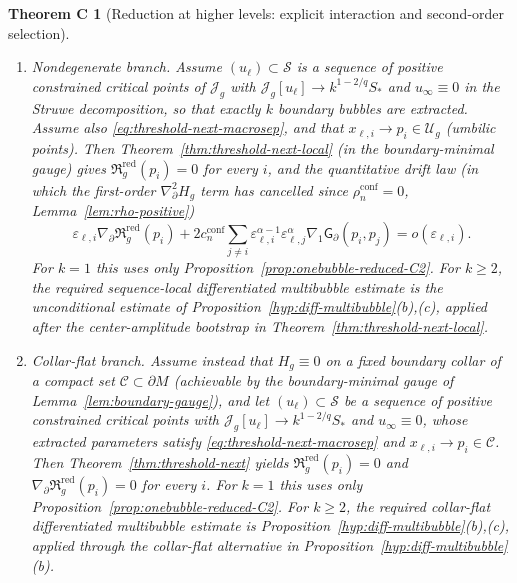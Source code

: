 \documentclass[11pt,reqno,a4paper]{amsart}
\numberwithin{equation}{section}
\theoremstyle{plain}
\theoremstyle{remark}
\theoremstyle{plain}
\newtheorem*{thmC}{Theorem C}
\begin{document}
\begin{thmC}[Reduction at higher levels: explicit interaction and second-order selection]
\begin{enumerate}[label=\textup{(\alph*)},leftmargin=1.5em]
\begin{enumerate}[label=\textup{(\roman*)},leftmargin=1.5em]
\item
\emph{Nondegenerate branch.}
Assume $(u_\ell)\subset\mathcal S$ is a sequence of positive constrained critical points
of $\mathcal J_g$ with
$\mathcal J_g[u_\ell]\to k^{1-2/q}S_\ast$ and $u_\infty\equiv0$
in the Struwe decomposition, so that exactly $k$ boundary bubbles are extracted.
Assume also \eqref{eq:threshold-next-macrosep}, and that
$x_{\ell,i}\to p_i\in\mathcal U_g$ (umbilic points).
Then Theorem~\ref{thm:threshold-next-local} (in the boundary-minimal gauge) gives
$\mathfrak R_g^{\mathrm{red}}(p_i)=0$ for every $i$,
and the quantitative drift law
(in which the first-order $\nabla^2_\partial H_g$ term has cancelled since
$\rho_n^{\mathrm{conf}}=0$, Lemma~\ref{lem:rho-positive})
\[
\varepsilon_{\ell,i}\nabla_\partial\mathfrak R_g^{\mathrm{red}}(p_i)
+2c_n^{\mathrm{conf}}\sum_{j\ne i}
\varepsilon_{\ell,i}^{\alpha-1}\varepsilon_{\ell,j}^{\alpha}
\nabla_1\mathsf G_\partial(p_i,p_j)
=o(\varepsilon_{\ell,i}).
\]
For $k=1$ this uses only Proposition~\ref{prop:onebubble-reduced-C2}.
For $k\ge2$, the required sequence-local differentiated multibubble estimate is the unconditional estimate of
Proposition~\ref{hyp:diff-multibubble}\textup{(b),(c)}, applied after the center-amplitude bootstrap in
Theorem~\ref{thm:threshold-next-local}.

\item
\emph{Collar-flat branch.}
Assume instead that $H_g\equiv0$ on a fixed boundary collar of a compact set
$\mathcal C\subset \partial M$ (achievable by the boundary-minimal gauge of Lemma~\ref{lem:boundary-gauge}),
and let $(u_\ell)\subset\mathcal S$ be a sequence of positive constrained critical points with
$\mathcal J_g[u_\ell]\to k^{1-2/q}S_\ast$ and $u_\infty\equiv0$,
whose extracted parameters satisfy \eqref{eq:threshold-next-macrosep} and
$x_{\ell,i}\to p_i\in\mathcal C$.
Then Theorem~\ref{thm:threshold-next} yields
$\mathfrak R_g^{\mathrm{red}}(p_i)=0$ and
$\nabla_\partial\mathfrak R_g^{\mathrm{red}}(p_i)=0$ for every $i$.
For $k=1$ this uses only Proposition~\ref{prop:onebubble-reduced-C2}.
For $k\ge2$, the required collar-flat differentiated multibubble estimate is
Proposition~\ref{hyp:diff-multibubble}\textup{(b),(c)}, applied through the collar-flat alternative in
Proposition~\ref{hyp:diff-multibubble}\textup{(b)}.
\end{enumerate}


\end{enumerate}
\end{thmC}
\end{document}
